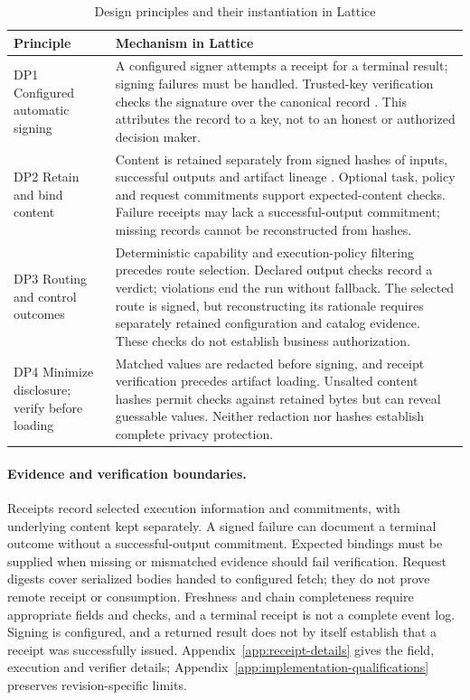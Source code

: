 \documentclass[11pt]{article}
\begin{document}
\begin{table}[t]
\centering
\caption{Design principles and their instantiation in Lattice}
\label{tab:dp-mechanism}
\footnotesize
\begin{tabularx}{\textwidth}{@{}>{\raggedright\arraybackslash}p{3.4cm}X@{}}
\toprule
Principle & Mechanism in Lattice \\
\midrule
DP1 Configured automatic signing & A configured signer attempts a receipt for a terminal result; signing failures must be handled. Trusted-key verification checks the signature over the canonical record \citep{rfc8785,dsse,rfc8032,bernstein2012}. This attributes the record to a key, not to an honest or authorized decision maker. \\
DP2 Retain and bind content & Content is retained separately from signed hashes of inputs, successful outputs and artifact lineage \citep{merkle1988}. Optional task, policy and request commitments support expected-content checks. Failure receipts may lack a successful-output commitment; missing records cannot be reconstructed from hashes. \\
DP3 Routing and control outcomes & Deterministic capability and execution-policy filtering precedes route selection. Declared output checks record a verdict; violations end the run without fallback. The selected route is signed, but reconstructing its rationale requires separately retained configuration and catalog evidence. These checks do not establish business authorization. \\
DP4 Minimize disclosure; verify before loading & Matched values are redacted before signing, and receipt verification precedes artifact loading. Unsalted content hashes permit checks against retained bytes but can reveal guessable values. Neither redaction nor hashes establish complete privacy protection. \\
\bottomrule
\end{tabularx}
\end{table}

\paragraph{Evidence and verification boundaries.} Receipts record selected execution information and commitments, with underlying content kept separately. A signed failure can document a terminal outcome without a successful-output commitment. Expected bindings must be supplied when missing or mismatched evidence should fail verification. Request digests cover serialized bodies handed to configured fetch; they do not prove remote receipt or consumption. Freshness and chain completeness require appropriate fields and checks, and a terminal receipt is not a complete event log. Signing is configured, and a returned result does not by itself establish that a receipt was successfully issued. Appendix~\ref{app:receipt-details} gives the field, execution and verifier details; Appendix~\ref{app:implementation-qualifications} preserves revision-specific limits.
\end{document}
